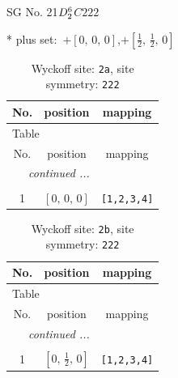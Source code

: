 \documentclass[fleqn,8pt]{jsarticle}
\begin{document}
\setcounter{MaxMatrixCols}{32}

\renewcommand{\tablename}{Table~}
\renewcommand{\figurename}{Figure~}
\begin{center}
\LARGE
SG No. 21\quad$D_{\rm 2}^{6}$\quad$C222$\quad[ orthorhombic ]
\end{center}
* plus set:\,\,\,$+\left[ 0,\, 0,\, 0 \right]$,\quad $+\left[ \frac{1}{2},\, \frac{1}{2},\, 0 \right]$
\renewcommand{\arraystretch}{1.2}
\begin{longtable}{ccc}
\caption{Wyckoff site: {\tt 2a}, site symmetry: {\tt 222}}
 \\
 \hline \hline
No. & position & mapping \\ \hline \endfirsthead

\multicolumn{2}{l}{\tablename\ \thetable{}} \\
 \hline \hline
No. & position & mapping \\ \hline \endhead

 \hline \hline
\multicolumn{2}{r}{\footnotesize\it continued ...} \\ \endfoot

 \hline \hline
\multicolumn{2}{r}{} \\ \endlastfoot

1 & $\left[ 0,\, 0,\, 0 \right]$ & {\tt [1,2,3,4]} \\
\end{longtable}
\renewcommand{\arraystretch}{1.2}
\begin{longtable}{ccc}
\caption{Wyckoff site: {\tt 2b}, site symmetry: {\tt 222}}
 \\
 \hline \hline
No. & position & mapping \\ \hline \endfirsthead

\multicolumn{2}{l}{\tablename\ \thetable{}} \\
 \hline \hline
No. & position & mapping \\ \hline \endhead

 \hline \hline
\multicolumn{2}{r}{\footnotesize\it continued ...} \\ \endfoot

 \hline \hline
\multicolumn{2}{r}{} \\ \endlastfoot

1 & $\left[ 0,\, \frac{1}{2},\, 0 \right]$ & {\tt [1,2,3,4]} \\
\end{longtable}
\renewcommand{\arraystretch}{1.2}
\end{document}
